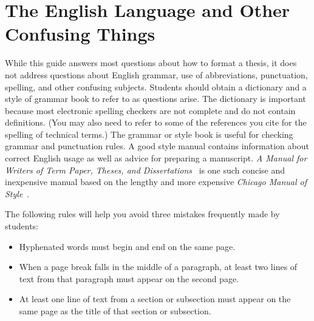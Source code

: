 \chapter{The English Language and Other Confusing Things}
\label{app:english-language}

While this guide answers most questions about how to format a thesis, it does
not address questions about English grammar, use of abbreviations, punctuation,
spelling, and other confusing subjects.  Students should obtain a dictionary
and a style of grammar book to refer to as questions arise.  The dictionary is
important because most electronic spelling checkers are not complete and do not
contain definitions.  (You may also need to refer to some of the references you
cite for the spelling of technical terms.)  The grammar or style book is useful
for checking grammar and punctuation rules.  A good style manual contains
information about correct English usage as well as advice for preparing a
manuscript.  \textit{A Manual for Writers of Term Paper, Theses, and
Dissertations}~\cite{Turabian} is one such concise and inexpensive manual based
on the lengthy and more expensive \textit{Chicago Manual of
Style}~\cite{ChicagoManual}.  

The following rules will help you avoid three mistakes frequently made
by students:
\begin{itemize} 
 \item Hyphenated words must begin and end on the same page.

 \item When a page break falls in the middle of a paragraph, at least
two lines of text from that paragraph must appear on the second page.

 \item At least one line of text from a section or subsection must
appear on the same page as the title of that section or subsection.
\end{itemize}

